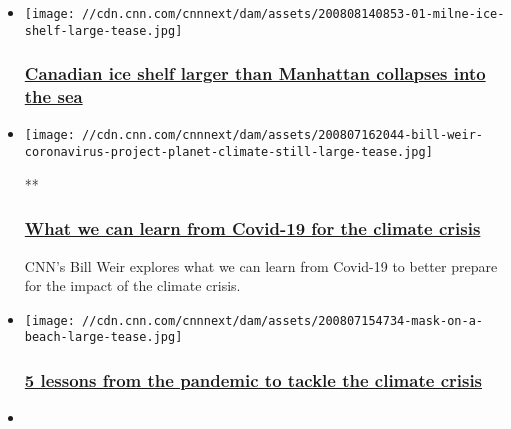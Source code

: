 \begin{itemize}
\item
  \href{/2020/08/08/weather/canada-ice-shelf-collapse-milne-manhattan/index.html}{}

  \texttt{[image: //cdn.cnn.com/cnnnext/dam/assets/200808140853-01-milne-ice-shelf-large-tease.jpg]}

  \hypertarget{canadian-ice-shelf-larger-than-manhattan-collapses-into-the-sea-}{%
  \subsubsection{\texorpdfstring{\href{/2020/08/08/weather/canada-ice-shelf-collapse-milne-manhattan/index.html}{Canadian
  ice shelf larger than Manhattan collapses into the sea
  }}{Canadian ice shelf larger than Manhattan collapses into the sea }}\label{canadian-ice-shelf-larger-than-manhattan-collapses-into-the-sea-}}
\item
  \href{/videos/weather/2020/08/07/bill-weir-climate-covid-19-project-planet-orig.cnn}{}

  \texttt{[image: //cdn.cnn.com/cnnnext/dam/assets/200807162044-bill-weir-coronavirus-project-planet-climate-still-large-tease.jpg]}

  **

  \hypertarget{what-we-can-learn-from-covid-19-for-the-climate-crisis}{%
  \subsubsection{\texorpdfstring{\href{/videos/weather/2020/08/07/bill-weir-climate-covid-19-project-planet-orig.cnn}{What
  we can learn from Covid-19 for the climate
  crisis}}{What we can learn from Covid-19 for the climate crisis}}\label{what-we-can-learn-from-covid-19-for-the-climate-crisis}}

  CNN's Bill Weir explores what we can learn from Covid-19 to better
  prepare for the impact of the climate crisis.
\item
  \href{/2020/08/07/weather/5-lessons-coronavirus-climate-crisis-weir-wxc/index.html}{}

  \texttt{[image: //cdn.cnn.com/cnnnext/dam/assets/200807154734-mask-on-a-beach-large-tease.jpg]}

  \hypertarget{5-lessons-from-the-pandemic-to-tackle-the-climate-crisis-}{%
  \subsubsection{\texorpdfstring{\href{/2020/08/07/weather/5-lessons-coronavirus-climate-crisis-weir-wxc/index.html}{5
  lessons from the pandemic to tackle the climate crisis
  }}{5 lessons from the pandemic to tackle the climate crisis }}\label{5-lessons-from-the-pandemic-to-tackle-the-climate-crisis-}}
\item
  \href{/videos/us/2020/08/07/new-york-city-power-outages-es-ldn-vpx.cnn}{}


\end{itemize}
